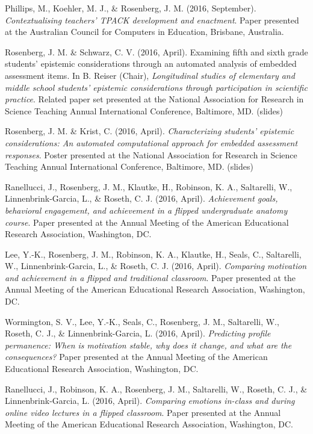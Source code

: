 \documentclass[14,]{article}
\begin{document}
Phillips, M., Koehler, M. J., \& Rosenberg, J. M. (2016, September).
\emph{Contextualising teachers' TPACK development and enactment}. Paper
presented at the Australian Council for Computers in Education,
Brisbane, Australia.

Rosenberg, J. M. \& Schwarz, C. V. (2016, April). Examining fifth and
sixth grade students' epistemic considerations through an automated
analysis of embedded assessment items. In B. Reiser (Chair),
\emph{Longitudinal studies of elementary and middle school students'
epistemic considerations through participation in scientific practice}.
Related paper set presented at the National Association for Research in
Science Teaching Annual International Conference, Baltimore, MD.
(slides)

Rosenberg, J. M. \& Krist, C. (2016, April). \emph{Characterizing
students' epistemic considerations: An automated computational approach
for embedded assessment responses}. Poster presented at the National
Association for Research in Science Teaching Annual International
Conference, Baltimore, MD. (slides)

Ranellucci, J., Rosenberg, J. M., Klautke, H., Robinson, K. A.,
Saltarelli, W., Linnenbrink-Garcia, L., \& Roseth, C. J. (2016, April).
\emph{Achievement goals, behavioral engagement, and achievement in a
flipped undergraduate anatomy course}. Paper presented at the Annual
Meeting of the American Educational Research Association, Washington,
DC.

Lee, Y.-K., Rosenberg, J. M., Robinson, K. A., Klautke, H., Seals, C.,
Saltarelli, W., Linnenbrink-Garcia, L., \& Roseth, C. J. (2016, April).
\emph{Comparing motivation and achievement in a flipped and traditional
classroom}. Paper presented at the Annual Meeting of the American
Educational Research Association, Washington, DC.

Wormington, S. V., Lee, Y.-K., Seals, C., Rosenberg, J. M., Saltarelli,
W., Roseth, C. J., \& Linnenbrink-Garcia, L. (2016, April).
\emph{Predicting profile permanence: When is motivation stable, why does
it change, and what are the consequences?} Paper presented at the Annual
Meeting of the American Educational Research Association, Washington,
DC.

Ranellucci, J., Robinson, K. A., Rosenberg, J. M., Saltarelli, W.,
Roseth, C. J., \& Linnenbrink-Garcia, L. (2016, April). \emph{Comparing
emotions in-class and during online video lectures in a flipped
classroom}. Paper presented at the Annual Meeting of the American
Educational Research Association, Washington, DC.
\end{document}
